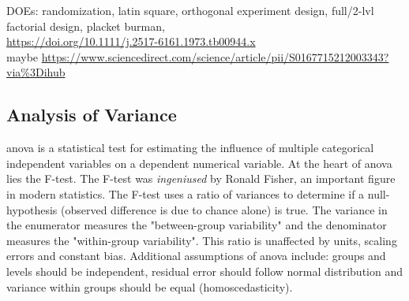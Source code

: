 DOEs: randomization, latin square, orthogonal experiment design, full/2-lvl factorial design, placket burman, \\
\url{https://doi.org/10.1111/j.2517-6161.1973.tb00944.x}\cite{whittle1973some}  \\
maybe \url{https://www.sciencedirect.com/science/article/pii/S0167715212003343?via\%3Dihub}
\fi

\pagebreak[4]
\subsection{Analysis of Variance} %
\Gls{anova} is a statistical test for estimating the influence of multiple categorical independent variables on a dependent numerical variable. 
At the heart of \gls{anova} lies the F-test. 
The F-test was \textit{ingeniused} by Ronald Fisher\cite{fisher1921on}, an important figure in modern statistics. 
The F-test uses a ratio of variances to determine if a null-hypothesis (observed difference is due to chance alone) is true. 
The variance in the enumerator measures the "between-group variability" and the denominator measures the "within-group variability".
This ratio is unaffected by units, scaling errors and constant bias. 
%
Additional assumptions of \gls{anova} include: groups and levels should be independent, 
residual error should follow normal distribution and variance within groups should be equal (homoscedasticity). 



